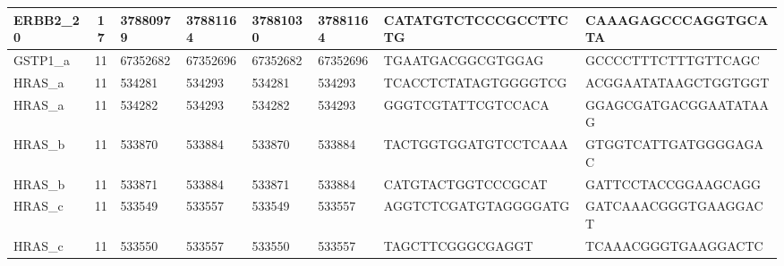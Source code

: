 \begin{landscape}
\begin{longtable}{| p{} | p{} | p{} | p{} | p{} | p{} | p{} | p{} |}
\multicolumn{1}{|l|}{ERBB2\_20}  & \multicolumn{1}{c|}{17} & \multicolumn{1}{l|}{37880979}  & \multicolumn{1}{l|}{37881164}  & \multicolumn{1}{l|}{37881030}  & \multicolumn{1}{l|}{37881164}  & \multicolumn{1}{l|}{CATATGTCTCCCGCCTTCTG}            & \multicolumn{1}{l|}{CAAAGAGCCCAGGTGCATA}           \\ \hline
\multicolumn{1}{|l|}{GSTP1\_a}   & \multicolumn{1}{c|}{11} & \multicolumn{1}{l|}{67352682}  & \multicolumn{1}{l|}{67352696}  & \multicolumn{1}{l|}{67352682}  & \multicolumn{1}{l|}{67352696}  & \multicolumn{1}{l|}{TGAATGACGGCGTGGAG}               & \multicolumn{1}{l|}{GCCCCTTTCTTTGTTCAGC}           \\ \hline
\multicolumn{1}{|l|}{HRAS\_a}    & \multicolumn{1}{c|}{11} & \multicolumn{1}{l|}{534281}    & \multicolumn{1}{l|}{534293}    & \multicolumn{1}{l|}{534281}    & \multicolumn{1}{l|}{534293}    & \multicolumn{1}{l|}{TCACCTCTATAGTGGGGTCG}            & \multicolumn{1}{l|}{ACGGAATATAAGCTGGTGGT}          \\ \hline
\multicolumn{1}{|l|}{HRAS\_a}    & \multicolumn{1}{c|}{11} & \multicolumn{1}{l|}{534282}    & \multicolumn{1}{l|}{534293}    & \multicolumn{1}{l|}{534282}    & \multicolumn{1}{l|}{534293}    & \multicolumn{1}{l|}{GGGTCGTATTCGTCCACA}              & \multicolumn{1}{l|}{GGAGCGATGACGGAATATAAG}         \\ \hline
\multicolumn{1}{|l|}{HRAS\_b}    & \multicolumn{1}{c|}{11} & \multicolumn{1}{l|}{533870}    & \multicolumn{1}{l|}{533884}    & \multicolumn{1}{l|}{533870}    & \multicolumn{1}{l|}{533884}    & \multicolumn{1}{l|}{TACTGGTGGATGTCCTCAAA}            & \multicolumn{1}{l|}{GTGGTCATTGATGGGGAGAC}          \\ \hline
\multicolumn{1}{|l|}{HRAS\_b}    & \multicolumn{1}{c|}{11} & \multicolumn{1}{l|}{533871}    & \multicolumn{1}{l|}{533884}    & \multicolumn{1}{l|}{533871}    & \multicolumn{1}{l|}{533884}    & \multicolumn{1}{l|}{CATGTACTGGTCCCGCAT}              & \multicolumn{1}{l|}{GATTCCTACCGGAAGCAGG}           \\ \hline
\multicolumn{1}{|l|}{HRAS\_c}    & \multicolumn{1}{c|}{11} & \multicolumn{1}{l|}{533549}    & \multicolumn{1}{l|}{533557}    & \multicolumn{1}{l|}{533549}    & \multicolumn{1}{l|}{533557}    & \multicolumn{1}{l|}{AGGTCTCGATGTAGGGGATG}            & \multicolumn{1}{l|}{GATCAAACGGGTGAAGGACT}          \\ \hline
\multicolumn{1}{|l|}{HRAS\_c}    & \multicolumn{1}{c|}{11} & \multicolumn{1}{l|}{533550}    & \multicolumn{1}{l|}{533557}    & \multicolumn{1}{l|}{533550}    & \multicolumn{1}{l|}{533557}    & \multicolumn{1}{l|}{TAGCTTCGGGCGAGGT}                & \multicolumn{1}{l|}{TCAAACGGGTGAAGGACTC}           \\ \hline

\end{longtable}
\end{landscape}
